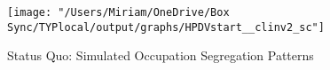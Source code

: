 \documentclass[12pt]{article}
\begin{document}
\begin{center}
\begin{figure}[H]
\centering
\caption{Status Quo: Simulated Occupation Segregation Patterns}
\label{fig:sq1}
\texttt{[image: "/Users/Miriam/OneDrive/Box Sync/TYPlocal/output/graphs/HPDVstart\_\_clinv2\_sc"]}
\end{figure}

\end{center}
\end{document}
